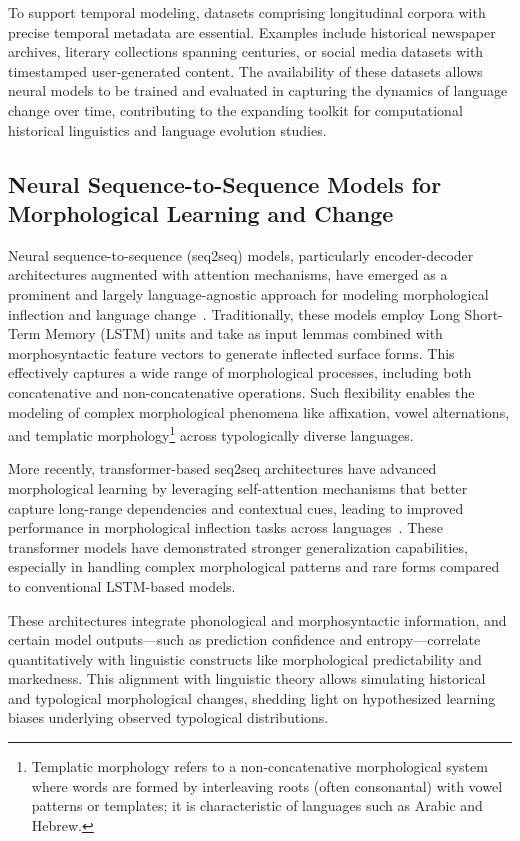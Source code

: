 \documentclass[sigconf]{acmart}
\begin{document}
To support temporal modeling, datasets comprising longitudinal corpora with precise temporal metadata are essential. Examples include historical newspaper archives, literary collections spanning centuries, or social media datasets with timestamped user-generated content. The availability of these datasets allows neural models to be trained and evaluated in capturing the dynamics of language change over time, contributing to the expanding toolkit for computational historical linguistics and language evolution studies.

\subsection{Neural Sequence-to-Sequence Models for Morphological Learning and Change}

Neural sequence-to-sequence (seq2seq) models, particularly encoder-decoder architectures augmented with attention mechanisms, have emerged as a prominent and largely language-agnostic approach for modeling morphological inflection and language change~\cite{ref42}. Traditionally, these models employ Long Short-Term Memory (LSTM) units and take as input lemmas combined with morphosyntactic feature vectors to generate inflected surface forms. This effectively captures a wide range of morphological processes, including both concatenative and non-concatenative operations. Such flexibility enables the modeling of complex morphological phenomena like affixation, vowel alternations, and templatic morphology\footnote{Templatic morphology refers to a non-concatenative morphological system where words are formed by interleaving roots (often consonantal) with vowel patterns or templates; it is characteristic of languages such as Arabic and Hebrew.} across typologically diverse languages.

More recently, transformer-based seq2seq architectures have advanced morphological learning by leveraging self-attention mechanisms that better capture long-range dependencies and contextual cues, leading to improved performance in morphological inflection tasks across languages~\cite{ref42}. These transformer models have demonstrated stronger generalization capabilities, especially in handling complex morphological patterns and rare forms compared to conventional LSTM-based models.

These architectures integrate phonological and morphosyntactic information, and certain model outputs—such as prediction confidence and entropy—correlate quantitatively with linguistic constructs like morphological predictability and markedness. This alignment with linguistic theory allows simulating historical and typological morphological changes, shedding light on hypothesized learning biases underlying observed typological distributions.
\end{document}
